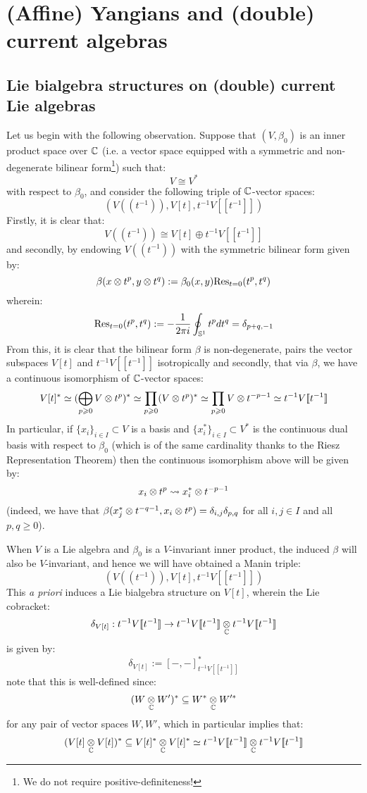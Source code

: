 \section{(Affine) Yangians and (double) current algebras}
    \subsection{Lie bialgebra structures on (double) current Lie algebras}
        Let us begin with the following observation. Suppose that $(V, \beta_0)$ is an inner product space over $\mathbb{C}$ (i.e. a vector space equipped with a symmetric and non-degenerate bilinear form\footnote{We do not require positive-definiteness!}) such that:
            $$V \cong V^*$$
        with respect to $\beta_0$, and consider the following triple of $\mathbb{C}$-vector spaces:
            $$( V(\!(t^{-1})\!), V[t], t^{-1}V[\![t^{-1}]\!] )$$
        Firstly, it is clear that:
            $$V(\!(t^{-1})\!) \cong V[t] \oplus t^{-1}V[\![t^{-1}]\!]$$
        and secondly, by endowing $V(\!(t^{-1})\!)$ with the symmetric bilinear form given by:
            $$\beta(x \tensor t^p, y \tensor t^q) := \beta_0(x, y) \Res_{t = 0}(t^p, t^q)$$
        wherein:
            $$\mathrm{Res}_{t = 0}(t^p, t^q) := -\frac{1}{2\pi i} \oint_{\mathbb{S}^1} t^p dt^q = \delta_{p + q, -1}$$
        From this, it is clear that the bilinear form $\beta$ is non-degenerate, pairs the vector subspaces $V[t]$ and $t^{-1}V[\![t^{-1}]\!]$ isotropically and secondly, that via $\beta$, we have a continuous isomorphism of $\mathbb{C}$-vector spaces:
            $$V[t]^* \cong (\bigoplus_{p \geq 0} V \tensor t^p)^* \cong \prod_{p \geq 0} (V \tensor t^p)^* \cong \prod_{p \geq 0} V \tensor t^{-p - 1} \cong t^{-1}V[\![t^{-1}]\!]$$
        In particular, if $\{x_i\}_{i \in I} \subset V$ is a basis and $\{x_i^*\}_{i \in I} \subset V^*$ is the continuous dual basis with respect to $\beta_0$ (which is of the same cardinality thanks to the Riesz Representation Theorem) then the continuous isomorphism above will be given by:
            $$x_i \tensor t^p \mapsto x_i^* \tensor t^{-p - 1}$$
        (indeed, we have that $\beta(x_j^* \tensor t^{-q - 1}, x_i \tensor t^p) = \delta_{i, j} \delta_{p, q}$ for all $i, j \in I$ and all $p, q \geq 0$). 

        When $V$ is a Lie algebra and $\beta_0$ is a $V$-invariant inner product, the induced  $\beta$ will also be $V$-invariant, and hence we will have obtained a Manin triple:
            $$( V(\!(t^{-1})\!), V[t], t^{-1}V[\![t^{-1}]\!] )$$
        This \textit{a priori} induces a Lie bialgebra structure on $V[t]$, wherein the Lie cobracket:
            $$\delta_{V[t]}: t^{-1}V[\![t^{-1}]\!] \to t^{-1}V[\![t^{-1}]\!] \tensor_{\bbC} t^{-1}V[\![t^{-1}]\!]$$
        is given by:
            $$\delta_{V[t]} := [-, -]_{t^{-1}V[\![t^{-1}]\!]}^*$$
        note that this is well-defined since:
            $$(W \tensor_{\bbC} W')^* \subseteq W^* \tensor_{\bbC} W'^*$$
        for any pair of vector spaces $W, W'$, which in particular implies that:
            $$(V[t] \tensor_{\bbC} V[t])^* \subseteq V[t]^* \tensor_{\bbC} V[t]^* \cong t^{-1}V[\![t^{-1}]\!] \tensor_{\bbC} t^{-1}V[\![t^{-1}]\!]$$
        
